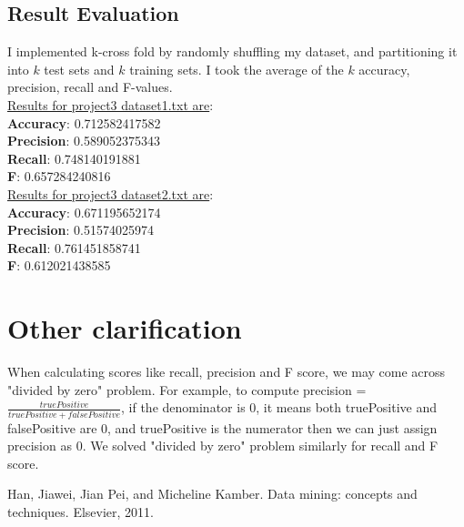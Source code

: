 \documentclass[paper=letter, fontsize=11pt]{article}
\numberwithin{equation}{section}		%
\numberwithin{figure}{section}			%
\numberwithin{table}{section}				%
\begin{document}
\subsection{Result Evaluation}
I implemented k-cross fold by randomly shuffling my dataset, and partitioning it into $k$ test sets and $k$ training sets. I took the average of the $k$ accuracy, precision, recall and F-values. \\

\noindent \underline{Results for project3 dataset1.txt are}: \\ 
\textbf{Accuracy}: 0.712582417582\\
\textbf{Precision}: 0.589052375343\\
\textbf{Recall}: 0.748140191881\\
\textbf{F}: 0.657284240816\\

\noindent \underline{Results for project3 dataset2.txt are}:\\
\textbf{Accuracy}: 0.671195652174\\
\textbf{Precision}: 0.51574025974\\
\textbf{Recall}: 0.761451858741\\
\textbf{F}: 0.612021438585\\


\section{Other clarification}
When calculating scores like recall, precision and F score, we may come across "divided by zero" problem. For example, to compute precision = $  \frac{truePositive}{truePositive + falsePositive}$, if the denominator is 0, it means both truePositive and falsePositive are 0, and truePositive is the numerator then we can just assign precision as 0. We solved "divided by zero" problem similarly for recall and F score.
 \begin{thebibliography}{1}
 Han, Jiawei, Jian Pei, and Micheline Kamber. Data mining: concepts and techniques. Elsevier, 2011.
 \end{thebibliography}
\end{document}
